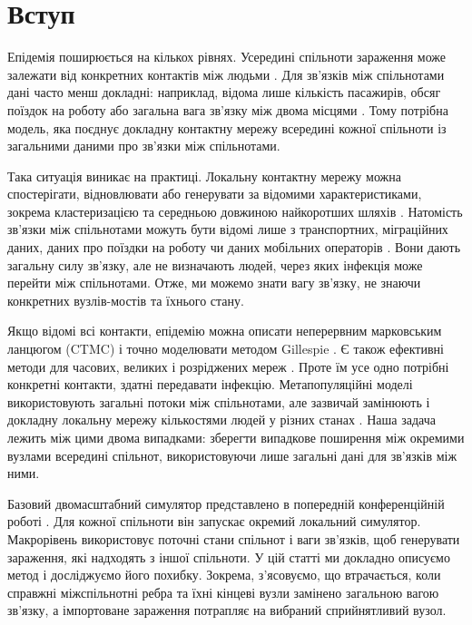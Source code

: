 \begingroup\color{red}
\hypersetup{citecolor=red,linkcolor=red}

\section{Вступ}
\label{sec:introduction}

Епідемія поширюється на кількох рівнях. Усередині спільноти зараження може залежати від конкретних контактів між людьми \citep{keeling2005,pastorsatorras2015,kiss2017}. Для зв'язків між спільнотами дані часто менш докладні: наприклад, відома лише кількість пасажирів, обсяг поїздок на роботу або загальна вага зв'язку між двома місцями \citep{balcan2009,barbosa2018human}. Тому потрібна модель, яка поєднує докладну контактну мережу всередині кожної спільноти із загальними даними про зв'язки між спільнотами.

Така ситуація виникає на практиці. Локальну контактну мережу можна спостерігати, відновлювати або генерувати за відомими характеристиками, зокрема кластеризацією та середньою довжиною найкоротших шляхів \citep{eubank2004,danon2011}. Натомість зв'язки між спільнотами можуть бути відомі лише з транспортних, міграційних даних, даних про поїздки на роботу чи даних мобільних операторів \citep{barbosa2018human,chang2021}. Вони дають загальну силу зв'язку, але не визначають людей, через яких інфекція може перейти між спільнотами. Отже, ми можемо знати вагу зв'язку, не знаючи конкретних вузлів-мостів та їхнього стану.

Якщо відомі всі контакти, епідемію можна описати неперервним марковським ланцюгом (CTMC) і точно моделювати методом Gillespie \citep{gillespie1977exact,gibson2000}. Є також ефективні методи для часових, великих і розріджених мереж \citep{vestergaard2015,kuryliak2025simulating}. Проте їм усе одно потрібні конкретні контакти, здатні передавати інфекцію. Метапопуляційні моделі використовують загальні потоки між спільнотами, але зазвичай замінюють і докладну локальну мережу кількостями людей у різних станах \citep{colizza2007reaction,colizza2008,balcan2010modeling,ajelli2010}. Наша задача лежить між цими двома випадками: зберегти випадкове поширення між окремими вузлами всередині спільнот, використовуючи лише загальні дані для зв'язків між ними.

Базовий двомасштабний симулятор представлено в попередній конференційній роботі \citep{kuryliak2025towards}. Для кожної спільноти він запускає окремий локальний симулятор. Макрорівень використовує поточні стани спільнот і ваги зв'язків, щоб генерувати зараження, які надходять з іншої спільноти. У цій статті ми докладно описуємо метод і досліджуємо його похибку. Зокрема, з'ясовуємо, що втрачається, коли справжні міжспільнотні ребра та їхні кінцеві вузли замінено загальною вагою зв'язку, а імпортоване зараження потрапляє на вибраний сприйнятливий вузол.


